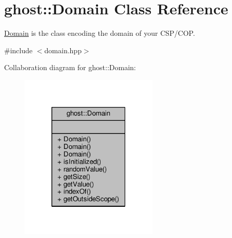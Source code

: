 \hypertarget{classghost_1_1Domain}{}\section{ghost\+:\+:Domain Class Reference}
\label{classghost_1_1Domain}


\hyperlink{classghost_1_1Domain}{Domain} is the class encoding the domain of your C\+S\+P/\+C\+OP.  




{\ttfamily \#include $<$domain.\+hpp$>$}



Collaboration diagram for ghost\+:\+:Domain\+:
\nopagebreak
\begin{figure}[H]
\begin{center}
\leavevmode
\includegraphics[width=187pt]{classghost_1_1Domain__coll__graph}
\end{center}
\end{figure}
